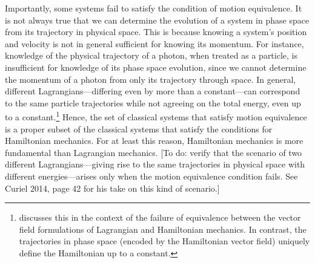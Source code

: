 \documentclass[letterpaper]{article}
\begin{document}
Importantly, some systems fail to satisfy the condition of motion equivalence. It is not always true that we can determine the evolution of a system in phase space from its trajectory in physical space. This is because knowing a system's position and velocity is not in general sufficient for knowing its momentum. For instance, knowledge of the physical trajectory of a photon, when treated as a particle, is insufficient for knowledge of its phase space evolution, since we cannot determine the momentum of a photon from only its trajectory through space. In general, different Lagrangians---differing even by more than a constant---can correspond to the same particle trajectories while not agreeing on the total energy, even up to a constant.\footnote{\textcites[1185--1186]{Barrett2} discusses this in the context of the failure of equivalence between the vector field formulations of Lagrangian and Hamiltonian mechanics. In contrast, the trajectories in phase space (encoded by the Hamiltonian vector field) uniquely define the Hamiltonian up to a constant.} Hence, the set of classical systems that satisfy motion equivalence is a proper subset of the classical systems that satisfy the conditions for Hamiltonian mechanics. For at least this reason, Hamiltonian mechanics is more fundamental than Lagrangian mechanics.
[To do: verify that the scenario of two different Lagrangians---giving rise to the same trajectories in physical space with different energies---arises only when the motion equivalence condition fails. See Curiel 2014, page 42 for his take on this kind of scenario.]


\end{document}
